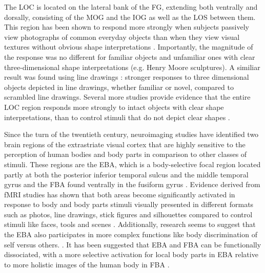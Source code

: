 The \gls{LOC} is located on the lateral bank of the \gls{FG}, extending both ventrally and dorsally, consisting of the \gls{MOG} and the \gls{IOG} as well as the \gls{LOS} between them. This region has been shown to respond more strongly when subjects passively view photographs of common everyday objects than when they view visual textures without obvious shape interpretations \cite{Malach1995}. Importantly, the magnitude of the response was no different for familiar objects and unfamiliar ones with clear three-dimensional shape interpretations (e.g. Henry Moore sculptures). A similiar result was found using line drawings \cite{Kanwisher1996}: stronger responses to three dimensional objects depicted in line drawings, whether familiar or novel, compared to scrambled line drawings. Several more studies provide evidence that the entire \gls{LOC} region responds more strongly to intact objects with clear shape interpretations, than to control stimuli that do not depict clear shapes \cite{Kalanit1998, Murtha1999, Kalanit2001}.

Since the turn of the twentieth century, neuroimaging studies have identified two brain regions of the extrastriate visual cortex that are highly sensitive to the perception of human bodies and body parts in comparison to other classes of stimuli. These regions are the \gls{EBA}, which is a body-selective focal region located partly at  both the posterior inferior temporal sulcus and the middle temporal gyrus \cite{Downing2001} and the \gls{FBA} found ventrally in the fusiform gyrus \cite{Peelen2005}. Evidence derived from \gls{fMRI} studies has shown that both areas become significantly activated in response to body and body parts stimuli visually presented in different formats such as photos, line drawings, stick figures and silhouettes compared to control stimuli like faces, tools and scenes \cite{Spiridon2006, Weiner2010, Amoruso2011}. Additionally, research seems to suggest that the \gls{EBA} also participates in more complex functions like body discrimination of self versus others. \cite{Pann2021}. It has been suggested that \gls{EBA} and \gls{FBA} can be functionally dissociated, with a more selective activation for local body parts in \gls{EBA} relative to more holistic images of the human body in \gls{FBA} \cite{Taylor2007}.

